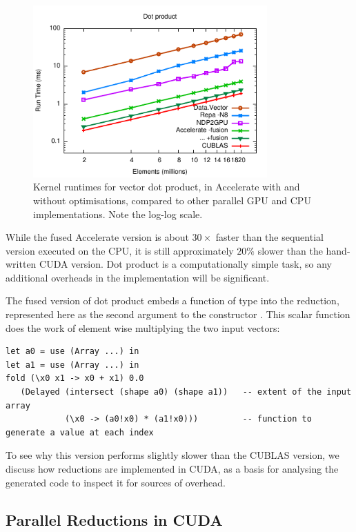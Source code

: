 \begin{figure}[htbp]
    \begin{center}
        \includegraphics[width=0.8\textwidth]{images/sec-6/dotp/dotp}
    \end{center}
    \caption[Vector dot product kernel benchmarks]{Kernel runtimes for vector
        dot product, in Accelerate with and without optimisations, compared to
        other parallel GPU and CPU implementations. Note the log-log scale.}
    \label{fig:dotp}
\end{figure}

While the fused Accelerate version is about $30\times$ faster than the
sequential version executed on the CPU, it is still approximately $20\%$ slower
than the hand-written CUDA version. Dot product is a computationally simple
task, so any additional overheads in the implementation will be significant.

The fused version of dot product embeds a function of type  into
the reduction, represented here as the second argument to the constructor
. This scalar function does the work of element wise multiplying
the two input vectors:
%
\begin{lstlisting}[style=haskell]
let a0 = use (Array ...) in
let a1 = use (Array ...) in
fold (\x0 x1 -> x0 + x1) 0.0
   (Delayed (intersect (shape a0) (shape a1))   -- extent of the input array
            (\x0 -> (a0!x0) * (a1!x0)))         -- function to generate a value at each index
\end{lstlisting}
%
To see why this version performs slightly slower than the CUBLAS version, we
discuss how reductions are implemented in CUDA, as a basis for analysing the
generated code to inspect it for sources of overhead.


\subsection{Parallel Reductions in CUDA}
\label{sec:parallel_reduction}

